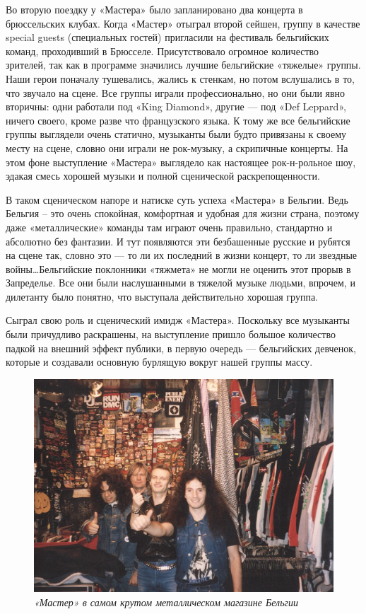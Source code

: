 \documentclass[16pt,a5paper,oneside]{book}
\begin{document}
Во вторую поездку у «Мастера» было запланировано два концерта в брюссельских клубах. Когда «Мастер» отыграл второй
сейшен, группу в качестве special guests (специальных гостей) пригласили на фестиваль бельгийских команд, проходивший в
Брюсселе. Присутствовало огромное количество зрителей, так как в программе значились лучшие бельгийские «тяжелые»
группы. Наши герои поначалу тушевались, жались к стенкам, но потом вслушались в то, что звучало на сцене. Все группы
играли профессионально, но они были явно вторичны: одни работали под «King Diamond», другие — под «Def Leppard», ничего
своего, кроме разве что французского языка. К тому же все бельгийские группы выглядели очень статично, музыканты были
будто привязаны к своему месту на сцене, словно они играли не рок-музыку, а скрипичные концерты. На этом фоне
выступление «Мастера» выглядело как настоящее рок-н-рольное шоу, эдакая смесь хорошей музыки и полной сценической
раскрепощенности.

В таком сценическом напоре и натиске суть успеха «Мастера» в Бельгии. Ведь Бельгия – это очень спокойная, комфортная и
удобная для жизни страна, поэтому даже «металлические» команды там играют очень правильно, стандартно и абсолютно без
фантазии. И тут появляются эти безбашенные русские и рубятся на сцене так, словно это — то ли их последний в жизни
концерт, то ли звездные войны\ldots Бельгийские поклонники «тяжмета» не могли не оценить этот прорыв в Запределье. Все
они были наслушанными в тяжелой музыке людьми, впрочем, и дилетанту было понятно, что выступала действительно хорошая
группа.

Сыграл свою роль и сценический имидж «Мастера». Поскольку все музыканты были причудливо раскрашены, на выступление
пришло большое количество падкой на внешний эффект публики, в первую очередь — бельгийских девченок, которые и создавали
основную бурлящую вокруг нашей группы массу.

\begin{figure}
    \centering
    \includegraphics[scale=0.8]{Image24}
    \caption{\textit{«Мастер» в самом крутом металлическом магазине Бельгии}}
\end{figure}
\end{document}
